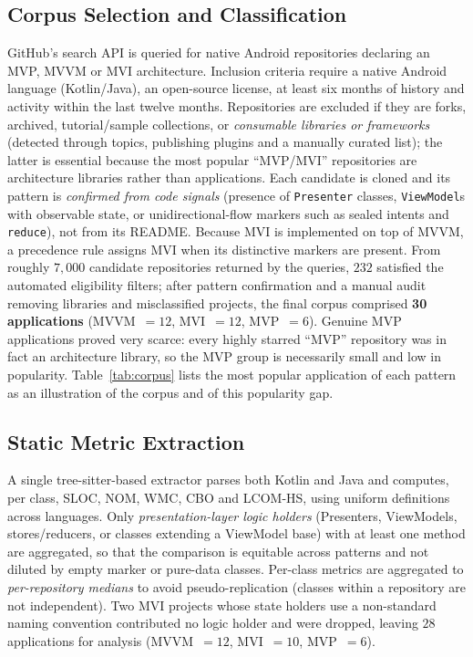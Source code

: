 \documentclass[conference]{IEEEtran}
\begin{document}
\subsection{Corpus Selection and Classification}
GitHub's search API is queried for native Android repositories declaring an MVP,
MVVM or MVI architecture. Inclusion criteria require a native Android language
(Kotlin/Java), an open-source license, at least six months of history and
activity within the last twelve months. Repositories are excluded if they are
forks, archived, tutorial/sample collections, or \emph{consumable libraries or
frameworks} (detected through topics, publishing plugins and a manually curated
list); the latter is essential because the most popular ``MVP/MVI'' repositories
are architecture libraries rather than applications. Each candidate is cloned
and its pattern is \emph{confirmed from code signals} (presence of
\texttt{Presenter} classes, \texttt{ViewModel}s with observable state, or
unidirectional-flow markers such as sealed intents and \texttt{reduce}), not from
its README. Because MVI is implemented on top of MVVM, a precedence rule assigns
MVI when its distinctive markers are present. From roughly $7{,}000$ candidate
repositories returned by the queries, $232$ satisfied the automated eligibility
filters; after pattern confirmation and a manual audit removing libraries and
misclassified projects, the final corpus comprised \textbf{30 applications}
(MVVM~$=12$, MVI~$=12$, MVP~$=6$). Genuine MVP applications proved very scarce:
every highly starred ``MVP'' repository was in fact an architecture library, so
the MVP group is necessarily small and low in popularity. Table~\ref{tab:corpus}
lists the most popular application of each pattern as an illustration of the
corpus and of this popularity gap.



\subsection{Static Metric Extraction}
A single tree-sitter-based extractor parses both Kotlin and Java and computes,
per class, SLOC, NOM, WMC, CBO and LCOM-HS, using uniform definitions across
languages. Only \emph{presentation-layer logic holders} (Presenters, ViewModels,
stores/reducers, or classes extending a ViewModel base) with at least one method
are aggregated, so that the comparison is equitable across patterns and not
diluted by empty marker or pure-data classes. Per-class metrics are aggregated to
\emph{per-repository medians} to avoid pseudo-replication (classes within a repository
are not independent). Two MVI projects whose state holders use a non-standard
naming convention contributed no logic holder and were dropped, leaving
$28$ applications for analysis (MVVM~$=12$, MVI~$=10$, MVP~$=6$).
\end{document}
